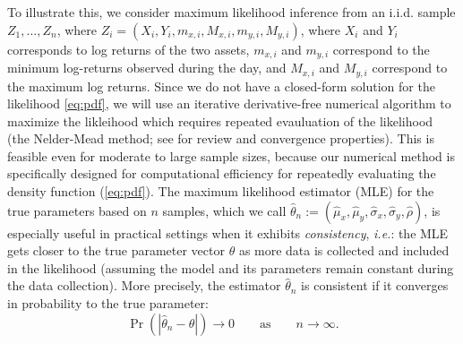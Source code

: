 To illustrate this, we consider maximum
likelihood inference from an i.i.d. sample $Z_1, \ldots, Z_n$, where
$Z_i = (X_i, Y_i, m_{x,i}, M_{x,i}, m_{y,i}, M_{y,i})$, where $X_i$
and $Y_i$ corresponds to log returns of the two assets, $m_{x,i}$ and
$m_{y,i}$ correspond to the minimum log-returns observed during the
day, and $M_{x,i}$ and $M_{y,i}$ correspond to the maximum log
returns.
Since we do not have a closed-form solution for the likelihood
\eqref{eq:pdf}, we will use an iterative derivative-free numerical
algorithm to maximize the likleihood which requires repeated
evauluation of the likelihood (the Nelder-Mead method; see
\cite{lagarias1998convergence} for review and convergence
properties). This is feasible even for moderate to large sample sizes,
because our numerical method is specifically designed for
computational efficiency for repeatedly evaluating the density
function (\ref{eq:pdf}). The maximum likelihood estimator (MLE) for
the true parameters based on $n$ samples, which we call
$\hat{\theta}_n := (\hat{\mu}_x, \hat{\mu}_y, \hat{\sigma}_x,
\hat{\sigma}_y, \hat{\rho})$, is especially useful in practical
settings when it exhibits \textit{consistency}, \textit{i.e.}: the MLE
gets closer to the true parameter vector $\theta$ as more data is
collected and included in the likelihood (assuming the model and its
parameters remain constant during the data collection). More
precisely, the estimator $\hat{\theta}_n$ is consistent if it
converges in probability to the true parameter:
\[
  \Pr( | \hat{\theta}_n - \theta | ) \to 0 \qquad \mbox{as} \qquad n \to \infty.
\]

